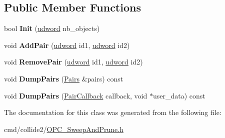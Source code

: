 \subsection*{Public Member Functions}
\begin{DoxyCompactItemize}
\item 
bool {\bfseries Init} (\hyperlink{IceTypes_8h_a44c6f1920ba5551225fb534f9d1a1733}{udword} nb\+\_\+objects)\hypertarget{classSAP__PairData_ae83191ac5b9f1084b9280c1be61f4d47}{}\label{classSAP__PairData_ae83191ac5b9f1084b9280c1be61f4d47}

\item 
void {\bfseries Add\+Pair} (\hyperlink{IceTypes_8h_a44c6f1920ba5551225fb534f9d1a1733}{udword} id1, \hyperlink{IceTypes_8h_a44c6f1920ba5551225fb534f9d1a1733}{udword} id2)\hypertarget{classSAP__PairData_a95cd61aec2388f8afc65095961fdb097}{}\label{classSAP__PairData_a95cd61aec2388f8afc65095961fdb097}

\item 
void {\bfseries Remove\+Pair} (\hyperlink{IceTypes_8h_a44c6f1920ba5551225fb534f9d1a1733}{udword} id1, \hyperlink{IceTypes_8h_a44c6f1920ba5551225fb534f9d1a1733}{udword} id2)\hypertarget{classSAP__PairData_a84609c97cc960c770d7946a4f36a9ef6}{}\label{classSAP__PairData_a84609c97cc960c770d7946a4f36a9ef6}

\item 
void {\bfseries Dump\+Pairs} (\hyperlink{classPairs}{Pairs} \&pairs) const \hypertarget{classSAP__PairData_ae04919507b1fce5341800bb5ed22f8e5}{}\label{classSAP__PairData_ae04919507b1fce5341800bb5ed22f8e5}

\item 
void {\bfseries Dump\+Pairs} (\hyperlink{OPC__SweepAndPrune_8h_a4609c7fbc34f117277b8b563bfb2d582}{Pair\+Callback} callback, void $\ast$user\+\_\+data) const \hypertarget{classSAP__PairData_a3eadd5031707b2ddfb2a2b56e0482190}{}\label{classSAP__PairData_a3eadd5031707b2ddfb2a2b56e0482190}

\end{DoxyCompactItemize}


The documentation for this class was generated from the following file\+:\begin{DoxyCompactItemize}
\item 
cmd/collide2/\hyperlink{OPC__SweepAndPrune_8h}{O\+P\+C\+\_\+\+Sweep\+And\+Prune.\+h}\end{DoxyCompactItemize}
